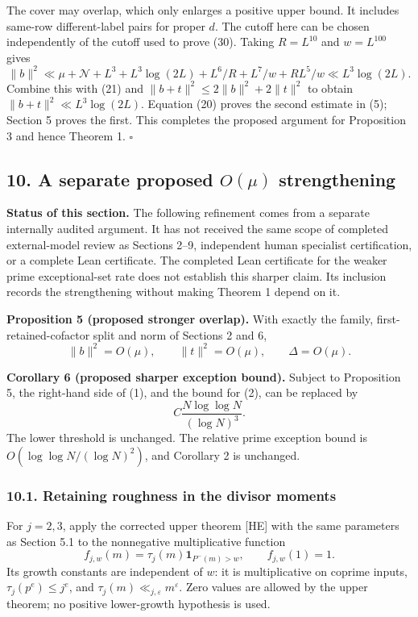 \documentclass[
  english,
  11pt,
]{article}
\begin{document}
The cover may overlap, which only enlarges a positive upper bound. It
includes same-row different-label pairs for proper \(d\). The cutoff
here can be chosen independently of the cutoff used to prove (30).
Taking \(R=L^{10}\) and \(w=L^{100}\) gives \[
\|b\|^2\ll\mu+\mathcal N+L^3+L^3\log(2L)
+L^6/R+L^7/w+RL^5/w\ll L^3\log(2L).
\] Combine this with (21) and \(\|b+t\|^2\le2\|b\|^2+2\|t\|^2\) to
obtain \(\|b+t\|^2\ll L^3\log(2L)\). Equation (20) proves the second
estimate in (5); Section 5 proves the first. This completes the proposed
argument for Proposition 3 and hence Theorem 1. \(\square\)

\subsection{\texorpdfstring{10. A separate proposed \(O(\mu)\)
strengthening}{10. A separate proposed O(\textbackslash mu) strengthening}}\label{a-separate-proposed-omu-strengthening}

\textbf{Status of this section.} The following refinement comes from a
separate internally audited argument. It has not received the same scope
of completed external-model review as Sections 2--9, independent human
specialist certification, or a complete Lean certificate. The completed
Lean certificate for the weaker prime exceptional-set rate does not
establish this sharper claim. Its inclusion records the strengthening
without making Theorem 1 depend on it.

\textbf{Proposition 5 (proposed stronger overlap).} With exactly the
family, first-retained-cofactor split and norm of Sections 2 and 6, \[
\|b\|^2=O(\mu),\qquad \|t\|^2=O(\mu),\qquad
\Delta=O(\mu). \tag{35}
\]

\textbf{Corollary 6 (proposed sharper exception bound).} Subject to
Proposition 5, the right-hand side of (1), and the bound for (2), can be
replaced by \[
C\frac{N\log\log N}{(\log N)^3}. \tag{36}
\] The lower threshold is unchanged. The relative prime exception bound
is \(O(\log\log N/(\log N)^2)\), and Corollary 2 is unchanged.

\subsubsection{10.1. Retaining roughness in the divisor
moments}\label{retaining-roughness-in-the-divisor-moments}

For \(j=2,3\), apply the corrected upper theorem {[}HE{]} with the same
parameters as Section 5.1 to the nonnegative multiplicative function \[
f_{j,w}(m)=\tau_j(m)\mathbf1_{P^-(m)>w},\qquad f_{j,w}(1)=1.
\] Its growth constants are independent of \(w\): it is multiplicative
on coprime inputs, \(\tau_j(p^e)\le j^e\), and
\(\tau_j(m)\ll_{j,\varepsilon}m^\varepsilon\). Zero values are allowed
by the upper theorem; no positive lower-growth hypothesis is used.
\end{document}
